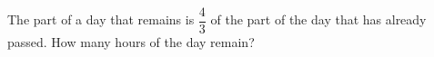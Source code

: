 The part of a day that remains is $\dfrac43$ of the part of the day that has already passed. How many hours of the day remain?
